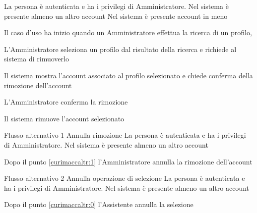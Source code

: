 
{}
{La persona è autenticata e ha i privilegi di Amministratore. Nel sistema è presente almeno un altro account}
{Nel sistema è presente account in meno}
{\begin{enumCU}
	\item Il caso d'uso ha inizio quando un Amministratore effettua la ricerca di un profilo, \label{curimaccaltr:0}
	\item L'Amministratore seleziona un profilo dal risultato della ricerca e richiede al sistema di rimuoverlo 
	\item Il sistema mostra l'account associato al profilo selezionato e chiede conferma della rimozione dell'account\label{curimaccaltr:1}
	\item L'Amministratore conferma la rimozione
	\item Il sistema rimuove l'account selezionato
\end{enumCU}}
%
{Flusso alternativo 1}%
{Annulla rimozione}%
{La persona è autenticata e ha i privilegi di Amministratore. Nel sistema è presente almeno un altro account}%
{\postNulle}%
{\begin{enumCU}
	\item Dopo il punto \ref{curimaccaltr:1} l'Amministratore annulla la rimozione dell'account
\end{enumCU}}%
%	
{Flusso alternativo 2}%
{Annulla operazione di selezione}%
{La persona è autenticata e ha i privilegi di Amministratore. Nel sistema è presente almeno un altro account}%
{\postNulle}%
{\begin{enumCU}
	\item Dopo il punto \ref{curimaccaltr:0} l'Assistente annulla la selezione
\end{enumCU}}%


